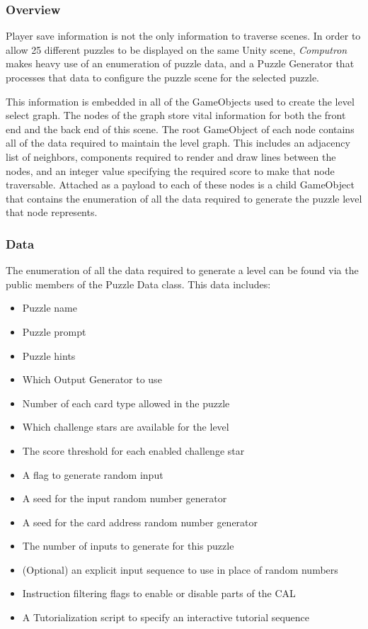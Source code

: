\subsubsection{Overview}
Player save information is not the only information to traverse scenes. In order to allow 25 different puzzles to be displayed on the same Unity scene, \textit{Computron} makes heavy use of an enumeration of puzzle data, and a Puzzle Generator that processes that data to configure the puzzle scene for the selected puzzle.

This information is embedded in all of the GameObjects used to create the level select graph. The nodes of the graph store vital information for both the front end and the back end of this scene. The root GameObject of each node contains all of the data required to maintain the level graph. This includes an adjacency list of neighbors, components required to render and draw lines between the nodes, and an integer value specifying the required score to make that node traversable. Attached as a payload to each of these nodes is a child GameObject that contains the enumeration of all the data required to generate the puzzle level that node represents.

\subsubsection{Data}
The enumeration of all the data required to generate a level can be found via the public members of the Puzzle Data class. This data includes:

\begin{itemize}
    \item Puzzle name
    \item Puzzle prompt
    \item Puzzle hints
    \item Which Output Generator to use
    \item Number of each card type allowed in the puzzle
    \item Which challenge stars are available for the level
    \item The score threshold for each enabled challenge star
    \item A flag to generate random input
    \item A seed for the input random number generator
    \item A seed for the card address random number generator
    \item The number of inputs to generate for this puzzle
    \item (Optional) an explicit input sequence to use in place of random numbers
    \item Instruction filtering flags to enable or disable parts of the CAL 
    \item A Tutorialization script to specify an interactive tutorial sequence
\end{itemize}

